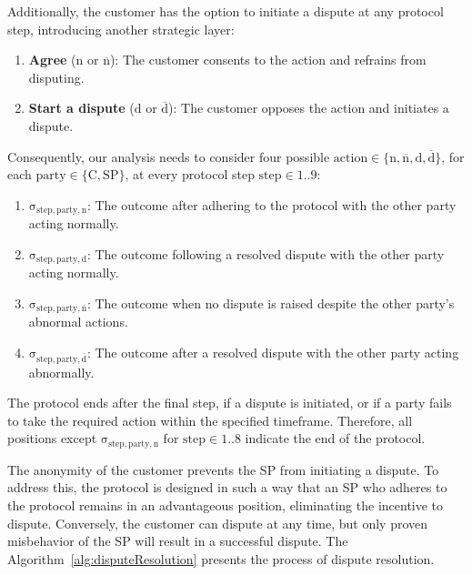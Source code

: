 \documentclass[pdftex,twocolumn,epjc3]{svjour3}
\newcommand{\normal}{\mathrm{n}}
\newcommand{\dispute}{\mathrm{d}}
\newcommand{\abnormal}{\overline{\mathrm{n}}}
\newcommand{\abdispute}{\overline{\mathrm{d}}}
\begin{document}
Additionally, the customer has the option to initiate a dispute at any protocol step, introducing another strategic layer:

\begin{enumerate}
\def\labelenumi{\arabic{enumi}.}
\item \textbf{Agree} ($\normal{}$ or $\abnormal{}$): The customer consents to the action and refrains from disputing.
\item \textbf{Start a dispute} ($\dispute{}$ or $\abdispute{}$): The customer opposes the action and initiates a dispute.
\end{enumerate}

\begin{sloppypar}
Consequently, our analysis needs to consider four possible $\mathrm{action} \in \{ \normal{}, \abnormal{}, \dispute{}, \abdispute{} \}$, for each $\mathrm{party \in \{C, SP\} }$, at every protocol step $\mathrm{step \in 1..9}$:
\end{sloppypar}

\begin{enumerate}
\item $\mathrm{\sigma_{step,party,\normal{}}}$: The outcome after adhering to the protocol with the other party acting normally.
\item $\mathrm{\sigma_{step,party,\dispute{}}}$: The outcome following a resolved dispute with the other party acting normally.
\item $\mathrm{\sigma_{step,party,\abnormal{}}}$: The outcome when no dispute is raised despite the other party's abnormal actions.
\item $\mathrm{\sigma_{step,party,\abdispute{}}}$: The outcome after a resolved dispute with the other party acting abnormally.
\end{enumerate}

\begin{sloppypar}
The protocol ends after the final step, if a dispute is initiated, or if a party fails to take the required action within the specified timeframe. Therefore, all positions except $\mathrm{\sigma_{step, party, n}}$ for $\mathrm{step} \in 1..8$ indicate the end of the protocol.
\end{sloppypar}

The anonymity of the customer prevents the SP from initiating a dispute. To address this, the protocol is designed in such a way that an SP who adheres to the protocol remains in an advantageous position, eliminating the incentive to dispute. Conversely, the customer can dispute at any time, but only proven misbehavior of the SP will result in a successful dispute. The Algorithm~\ref{alg:disputeResolution} presents the process of dispute resolution.
\end{document}
